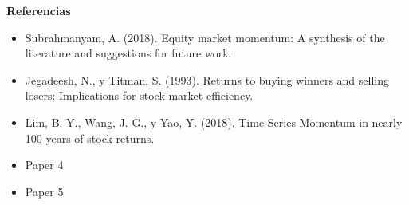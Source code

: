 \documentclass[a0,portrait]{a0poster}
\newcommand{\customsection}[1]{
    \begin{center}
        \begin{tcolorbox}[colframe=miRojo!50, colback=miRojo!30, width=\linewidth, boxrule=1mm, arc=3mm, auto outer arc]
            \begin{center}
            \vspace{.5cm} %
            \color{black}
            \textbf{\Huge #1}
            \color{miRojo}
            \vspace{.5cm} %
            \end{center}
        \end{tcolorbox}
    \end{center}
}
\begin{document}
\begin{multicols}{2}
    \customsection{Referencias}
    \par
         \begin{itemize}
            \item Subrahmanyam, A. (2018). Equity market momentum: A synthesis of the literature and suggestions for future work.
            \item Jegadeesh, N., y Titman, S. (1993). Returns to buying winners and selling losers: Implications for stock market efficiency.
            \item Lim, B. Y., Wang, J. G., y Yao, Y. (2018). Time-Series Momentum in nearly 100 years of stock returns.            \item Paper 4
            \item Paper 5
        \end{itemize}
        
    
    
    
    
\end{multicols}
\end{document}
